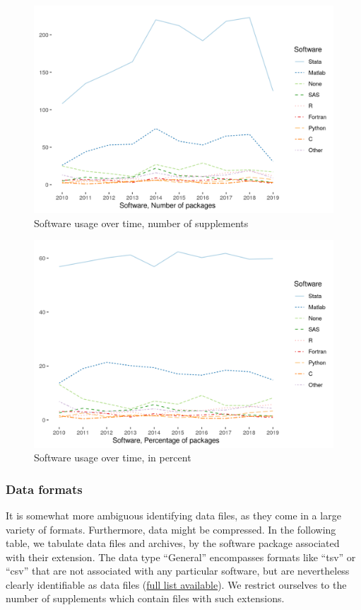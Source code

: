 \documentclass[]{article}
\begin{document}
\begin{figure}
\centering
\includegraphics{figure_software_years_count.png}
\caption{Software usage over time, number of supplements}
\end{figure}

\begin{figure}
\centering
\includegraphics{figure_software_years_pct.png}
\caption{Software usage over time, in percent}
\end{figure}

\hypertarget{data-formats}{%
\subsubsection{Data formats}\label{data-formats}}

It is somewhat more ambiguous identifying data files, as they come in a
large variety of formats. Furthermore, data might be compressed. In the
following table, we tabulate data files and archives, by the software
package associated with their extension. The data type ``General''
encompasses formats like ``tsv'' or ``csv'' that are not associated with
any particular software, but are nevertheless clearly identifiable as
data files (\href{../data/original/aea_file_ext.csv}{full list
available}). We restrict ourselves to the number of supplements which
contain files with such extensions.
\end{document}
